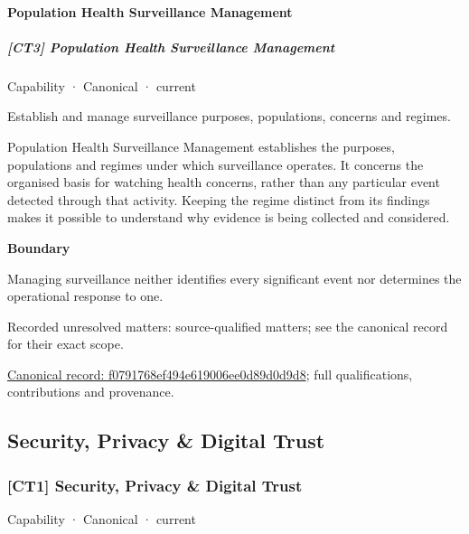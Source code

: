 \paragraph{Population Health Surveillance Management}

\subparagraph{[CT3] Population Health Surveillance Management}

\label{element:f0791768ef494e619006ee0d89d0d9d8}
{\small Capability · Canonical · current}\par

Establish and manage surveillance purposes, populations, concerns and regimes.



Population Health Surveillance Management establishes the purposes, populations and regimes under which surveillance operates. It concerns the organised basis for watching health concerns, rather than any particular event detected through that activity. Keeping the regime distinct from its findings makes it possible to understand why evidence is being collected and considered.



\textbf{Boundary}



Managing surveillance neither identifies every significant event nor determines the operational response to one.


{\small Recorded unresolved matters: source-qualified matters; see the canonical record for their exact scope.}\par
{\footnotesize \href{../../../../continuum/strategy/capability/f0791768ef494e619006ee0d89d0d9d8.md}{Canonical record: f0791768ef494e619006ee0d89d0d9d8}; full qualifications, contributions and provenance.}\par
\subsection{Security, Privacy \& Digital Trust}

\subsubsection{[CT1] Security, Privacy \& Digital Trust}

\label{element:71f0431fdfcd4f779e16d9e5ea609833}
{\small Capability · Canonical · current}\par

